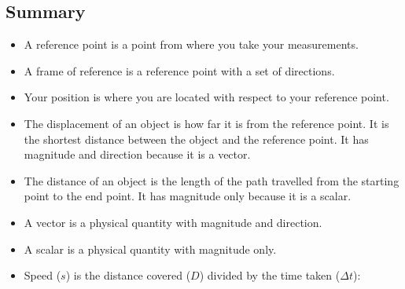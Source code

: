     \noindent
  
    
    \label{m38796*cid12}
            \subsection{ Summary}
            \nopagebreak
            
      
      \label{m38796*id80622}\begin{itemize}[noitemsep]
            \label{m38796*uid154}\item A reference point is a point from where you take your measurements.
\label{m38796*uid155}\item A frame of reference is a reference point with a set of directions.
\label{m38796*uid156}\item Your position is where you are located with respect to your reference point.
\label{m38796*uid157}\item The displacement of an object is how far it is from the reference point. It is the shortest distance between the object and the reference point. It has magnitude and direction because it is a vector.
\label{m38796*uid158}\item The distance of an object is the length of the path travelled from the starting point to the end point. It has magnitude only because it is a scalar.
\label{m38796*uid159}\item A vector is a physical quantity with magnitude and direction.
\label{m38796*uid160}\item A scalar is a physical quantity with magnitude only.
\label{m38796*uid161}\item Speed (\begin{math}s\end{math}) is the distance covered (\begin{math}D\end{math}) divided by the time taken (\begin{math}\Delta t\end{math}):
\label{m38796*id80758}\nopagebreak\noindent{}
\end{itemize}
